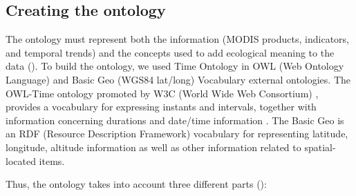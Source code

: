 \subsection{Creating the ontology}\label{sec:onto:Creating}

The ontology must represent both the information (MODIS products, indicators, and temporal trends) and the concepts used to add ecological meaning to the data (). To build the ontology, we used Time Ontology in OWL (Web Ontology Language) \autocite{HobbsPan2004OntologyTime} and Basic Geo (WGS84 lat/long) Vocabulary \autocite{Brickley2003BasicGeo} external ontologies. The OWL-Time ontology promoted by W3C (World Wide Web Consortium) \autocite{W3C2013LargeTriple}, provides a vocabulary for expressing instants and intervals, together with information concerning durations and date/time information \autocite{HobbsPan2004OntologyTime}. The Basic Geo is an RDF (Resource Description Framework) vocabulary for representing latitude, longitude, altitude information as well as other information related to spatial-located items.

Thus, the ontology takes into account three different parts ():

